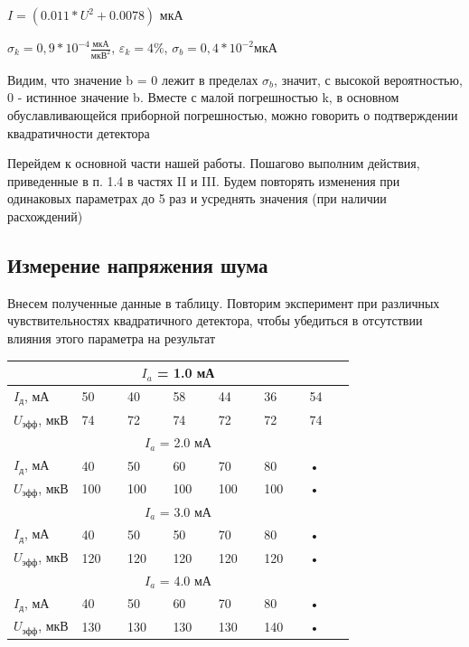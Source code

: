 \documentclass[12pt,a4paper]{article}
\begin{document}
\par $I = (0.011*U^2 + 0.0078)$ мкА

\par $\sigma_{k} = 0,9*10^{-4}\frac{\text{мкА}}{\text{мкВ}^2}$, $\varepsilon_{k} = 4\%$, $\sigma_{b} = 0,4*10^{-2}\text{мкА}$

\par Видим, что значение b = 0 лежит в пределах $\sigma_{b}$, значит, с высокой вероятностью, 0 - истинное значение b. Вместе с 
малой погрешностью k, в основном обуславливающейся приборной погрешностью, можно говорить о подтверждении квадратичности детектора

\par Перейдем к основной части нашей работы. Пошагово выполним действия, приведенные в п. 1.4 в частях II и III. Будем повторять изменения при одинаковых параметрах до 5 раз и усреднять значения (при наличии расхождений)

\subsection{Измерение напряжения шума}

\par Внесем полученные данные в таблицу. Повторим эксперимент при различных чувствительностях квадратичного детектора, чтобы убедиться в отсутствии влияния этого параметра на результат

\begin{tabular}{|p{0.15\linewidth}|p{0.1\linewidth}|p{0.1\linewidth}|p{0.1\linewidth}|p{0.1\linewidth}|p{0.1\linewidth}|p{0.1\linewidth}|}
  \hline 
  \multicolumn{7}{|c|}{$I_a$ = 1.0 мА} \\ 
  \hline 
  $I_\text{д}$, мА & 50 & 40 & 58 & 44 & 36 & 54 \\ 
  \hline 
  $U_\text{эфф}$, мкВ & 74 & 72 & 74 & 72 & 72 & 74 \\ 
  \hline 
  \multicolumn{7}{|c|}{$I_a$ = 2.0 мА} \\ 
  \hline 
  $I_\text{д}$, мА & 40 & 50 & 60 & 70 & 80 & • \\ 
  \hline 
  $U_\text{эфф}$, мкВ & 100 & 100 & 100 & 100 & 100 & • \\ 
  \hline 
  \multicolumn{7}{|c|}{$I_a$ = 3.0 мА} \\ 
  \hline 
  $I_\text{д}$, мА & 40 & 50 & 50 & 70 & 80 & • \\ 
  \hline 
  $U_\text{эфф}$, мкВ & 120 & 120 & 120 & 120 & 120 & • \\ 
  \hline 
  \multicolumn{7}{|c|}{$I_a$ = 4.0 мА} \\ 
  \hline 
  $I_\text{д}$, мА & 40 & 50 & 60 & 70 & 80 & • \\ 
  \hline 
  $U_\text{эфф}$, мкВ & 130 & 130 & 130 & 130 & 140 & • \\ 
  \hline 
  \end{tabular}   
\end{document}
